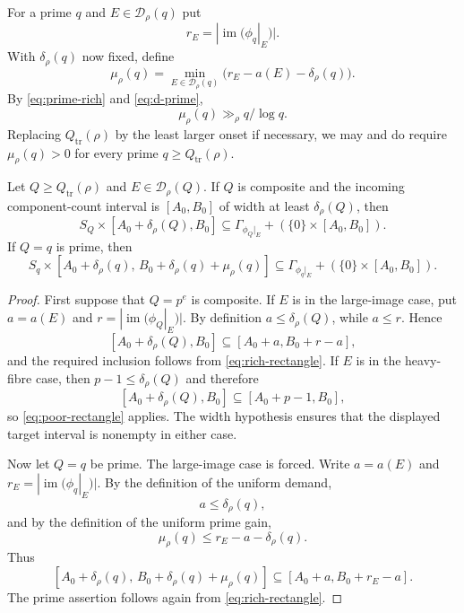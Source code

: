 For a prime $q$ and $E\in\mathcal D_\rho(q)$ put
\[
r_E=|\operatorname{im}(\phi_q|_E)|.
\]
With $\delta_\rho(q)$ now fixed, define
\begin{equation}\label{eq:common-prime-gain}
\mu_\rho(q)=
\min_{E\in\mathcal D_\rho(q)}
\bigl(r_E-a(E)-\delta_\rho(q)\bigr).
\end{equation}
By \eqref{eq:prime-rich} and \eqref{eq:d-prime},
\begin{equation}\label{eq:prime-gain-scale}
\mu_\rho(q)\gg_\rho q/\log q.
\end{equation}
Replacing $Q_{\mathrm{tr}}(\rho)$ by the least larger onset if necessary, we may and do require $\mu_\rho(q)>0$ for every prime $q\ge Q_{\mathrm{tr}}(\rho)$.

\begin{theorem}\label{thm:uniform-profile}
Let $Q\ge Q_{\mathrm{tr}}(\rho)$ and $E\in\mathcal D_\rho(Q)$.  If $Q$ is composite and the incoming component-count interval is $[A_0,B_0]$ of width at least $\delta_\rho(Q)$, then
\[
S_Q\times[A_0+\delta_\rho(Q),B_0]
\subseteq
\Gamma_{\phi_Q|_E}+(\{0\}\times[A_0,B_0]).
\]
If $Q=q$ is prime, then
\[
S_q\times
[A_0+\delta_\rho(q),\,B_0+\delta_\rho(q)+\mu_\rho(q)]
\subseteq
\Gamma_{\phi_q|_E}+(\{0\}\times[A_0,B_0]).
\]
\end{theorem}

\begin{proof}
First suppose that $Q=p^e$ is composite.  If $E$ is in the large-image case, put $a=a(E)$ and $r=|\operatorname{im}(\phi_Q|_E)|$.  By definition $a\le\delta_\rho(Q)$, while $a\le r$.  Hence
\[
[A_0+\delta_\rho(Q),B_0]
\subseteq
[A_0+a,B_0+r-a],
\]
and the required inclusion follows from \eqref{eq:rich-rectangle}.  If $E$ is in the heavy-fibre case, then $p-1\le\delta_\rho(Q)$ and therefore
\[
[A_0+\delta_\rho(Q),B_0]
\subseteq
[A_0+p-1,B_0],
\]
so \eqref{eq:poor-rectangle} applies.  The width hypothesis ensures that the displayed target interval is nonempty in either case.

Now let $Q=q$ be prime.  The large-image case is forced.  Write $a=a(E)$ and $r_E=|\operatorname{im}(\phi_q|_E)|$.  By the definition of the uniform demand,
\[
a\le\delta_\rho(q),
\]
and by the definition of the uniform prime gain,
\[
\mu_\rho(q)
\le r_E-a-\delta_\rho(q).
\]
Thus
\[
[A_0+\delta_\rho(q),\,B_0+\delta_\rho(q)+\mu_\rho(q)]
\subseteq
[A_0+a,B_0+r_E-a].
\]
The prime assertion follows again from \eqref{eq:rich-rectangle}.
\end{proof}
